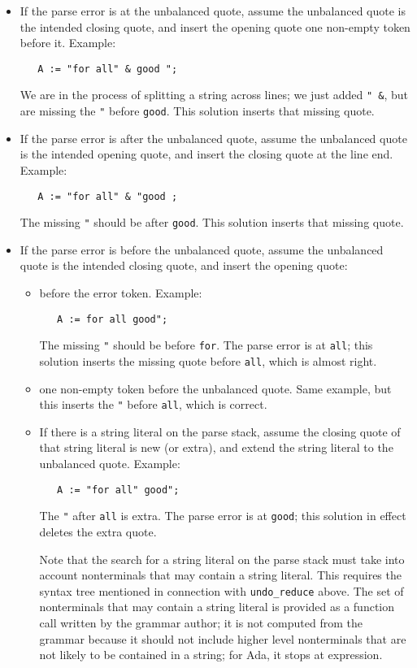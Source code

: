 \documentclass{article}
\begin{document}
\begin{itemize}
\item If the parse error is at the unbalanced quote, assume the unbalanced
quote is the intended closing quote, and insert the opening quote one
non-empty token before it. Example:
\begin{verbatim}
   A := "for all" & good ";
\end{verbatim}
We are in the process of splitting a string across lines; we just
added \verb|" &|, but are missing the \verb|"| before \verb|good|.
This solution inserts that missing quote.

\item If the parse error is after the unbalanced quote, assume the unbalanced
quote is the intended opening quote, and insert the closing quote at
the line end. Example:
\begin{verbatim}
   A := "for all" & "good ;
\end{verbatim}
The missing \verb|"| should be after \verb|good|.
This solution inserts that missing quote.

\item If the parse error is before the unbalanced quote, assume the unbalanced
quote is the intended closing quote, and insert the opening quote:

\begin{itemize}
\item before the error token. Example:
\begin{verbatim}
   A := for all good";
\end{verbatim}
The missing \verb|"| should be before \verb|for|. The parse error is at \verb|all|;
this solution inserts the missing quote before \verb|all|, which is
almost right.

\item one non-empty token before the unbalanced quote. Same example,
  but this inserts the \verb|"| before \verb|all|, which is correct.

\item If there is a string literal on the parse stack,
assume the closing quote of that string literal is new (or extra),
and extend the string literal to the unbalanced quote. Example:
\begin{verbatim}
   A := "for all" good";
\end{verbatim}
The \verb|"| after \verb|all| is extra. The parse error is at \verb|good|;
this solution in effect deletes the extra quote.

Note that the search for a string literal on the parse stack must take
into account nonterminals that may contain a string literal. This
requires the syntax tree mentioned in connection with
\verb|undo_reduce| above. The set of nonterminals that may contain a
string literal is provided as a function call written by the grammar
author; it is not computed from the grammar because it should not
include higher level nonterminals that are not likely to be contained
in a string; for Ada, it stops at expression.
\end{itemize}
\end{itemize}
\end{document}

